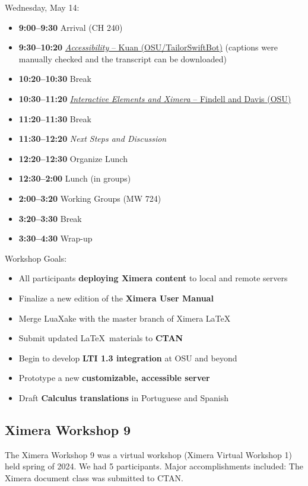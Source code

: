 \documentclass{ximera}
\begin{document}
Wednesday, May 14:
\begin{itemize}[leftmargin=2em]
    \item \textbf{9:00--9:30} Arrival (CH 240)
    \item \textbf{9:30--10:20} \href{https://mediasite.osu.edu/Mediasite/channel/2b1820c007b84e5ea019ba8a1a238c5b5f/watch/b384b5ea22cd42c5a317419fd5cc24901d}{\emph{Accessibility} -- Kuan (OSU/TailorSwiftBot)} (captions were manually checked and the transcript can be downloaded)
    \item \textbf{10:20--10:30} Break
    \item \textbf{10:30--11:20} \href{https://mediasite.osu.edu/Mediasite/channel/2b1820c007b84e5ea019ba8a1a238c5b5f/watch/8bf742a386844069b015c530d56697db1d}{\emph{Interactive Elements and Ximera} -- Findell and Davis (OSU)}
    \item \textbf{11:20--11:30} Break
    \item \textbf{11:30--12:20} \emph{Next Steps and Discussion}
    \item \textbf{12:20--12:30} Organize Lunch
    \item \textbf{12:30--2:00} Lunch (in groups)
    \item \textbf{2:00--3:20} Working Groups (MW 724)
    \item \textbf{3:20--3:30} Break
    \item \textbf{3:30--4:30} Wrap-up
\end{itemize}

Workshop Goals:
\begin{itemize}
    \item All participants \textbf{deploying Ximera content} to local and remote servers
    \item Finalize a new edition of the \textbf{Ximera User Manual}
    \item Merge LuaXake with the master branch of Ximera \LaTeX
    \item Submit updated \LaTeX\ materials to \textbf{CTAN}
    \item Begin to develop \textbf{LTI 1.3 integration} at OSU and beyond
    \item Prototype a new \textbf{customizable, accessible server}
    \item Draft \textbf{Calculus translations} in Portuguese and Spanish
\end{itemize}


\subsection*{Ximera Workshop 9}
The Ximera Workshop 9 was a virtual workshop (Ximera Virtual Workshop 1) held spring of 2024. We had 5 participants. Major accomplishments included: The Ximera document class was submitted to CTAN.
\end{document}
